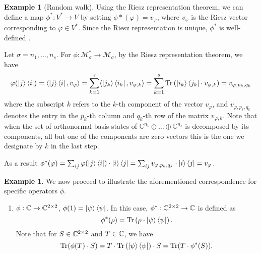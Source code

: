\documentclass[10pt,a4paper]{amsart}
\theoremstyle{definition}
\theoremstyle{definition}
\newtheorem{example}[definition]{Example}
\theoremstyle{definition}
\theoremstyle{definition}
\theoremstyle{definition}
\theoremstyle{definition}
\begin{document}
\begin{example}[Random walk]
Using the Riesz representation theorem, we can define a map 
$\phi^* : V^* \to V$
by setting \(\phi*(\varphi) = v_\varphi\), where \(v_\varphi\) is the Riesz vector corresponding to \(\varphi \in V^*\). Since the Riesz representation is unique, \(\phi^*\) is well-defined \cite{romanAdvancedLinearAlgebra1992}. 

Let $\sigma= n_1, \ldots, n_s$. For $\phi: \mathcal{M}_\sigma^* \to \mathcal{M}_\sigma $, by the Riesz representation theorem, we have
$$ \varphi(\ket{j} \bra{i})= \langle \ket{j} \bra{i},  v_\varphi  \rangle = \sum_{k=1}^s \langle \ket{j_k} \bra{i_k},  v_{\varphi,k}  \rangle = \sum_{k=1}^s  \text{Tr} \left( \ket{i_k} \bra{j_k} \cdot   v_{\varphi,k} \right) =  v_{\varphi,p_k,q_k} $$
where the subscript \(k\) refers to the \(k\)-th component of the vector \(v_\varphi\), and \(v_{\varphi, p_k, q_k}\) denotes the entry in the \(p_k\)-th column and \(q_k\)-th row of the matrix \(v_{\varphi,k}\). Note that when the set of orthonormal basis states of \(\mathbb{C}^{n_1} \oplus \ldots \oplus \mathbb{C}^{n_s}\) is decomposed by its components, all but one of the components are zero vectors this is the one we designate by $k$ in the last step.

As a result $\phi^*(\varphi) =  \sum_{ij} \varphi(\ket{j}\bra{i}) \cdot \ket{i} \bra{j} = \sum_{ij}  v_{\varphi,p_k,q_k} \cdot  \ket{i} \bra{j}  = v_{\varphi}$.



\begin{example}
  We now proceed to illustrate the aforementioned correspondence for specific operators $\phi$.
  \begin{enumerate}
    \item $\phi: \mathbb{C} \to \mathbb{C}^{2 \times 2}$, $ \phi(1)= \ket{\psi}\bra{\psi}$. In this case, $\phi^*:\mathbb{C}^{2 \times 2} \to \mathbb{C}$ is defined as  
    $$\phi^*(\rho) =  \text{Tr}\left( \rho \cdot \ket{\psi}\bra{\psi}\right).$$ 
    Note that for $S \in \mathbb{C}^{2 \times 2}$ and $T \in \mathbb{C}$, we have 
    $$\text{Tr}(\phi(T)\cdot S) =  T \cdot \text{Tr}\left(\ket{\psi}\bra{\psi}\right) \cdot S = \text{Tr}(T\cdot \phi^*(S)). $$


\end{enumerate}
\end{example}
\end{example}
\end{document}
